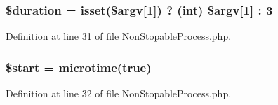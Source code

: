 \subsubsection[{\$duration}]{\setlength{\rightskip}{0pt plus 5cm}\${\bf duration} = isset(\$argv[1]) ? (int) \$argv[1] \+: 3}\label{_non_stopable_process_8php_acae43950182b63cd06434397298dad7d}


Definition at line 31 of file Non\+Stopable\+Process.\+php.

\subsubsection[{\$start}]{\setlength{\rightskip}{0pt plus 5cm}\$start = microtime(true)}\label{_non_stopable_process_8php_a50a00e7de77365e00b117e73aa82fb9b}


Definition at line 32 of file Non\+Stopable\+Process.\+php.

